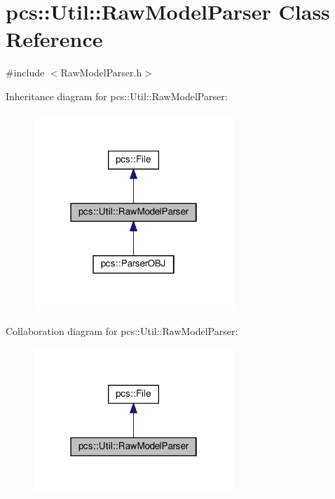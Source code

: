 \hypertarget{classpcs_1_1Util_1_1RawModelParser}{}\section{pcs\+:\+:Util\+:\+:Raw\+Model\+Parser Class Reference}
\label{classpcs_1_1Util_1_1RawModelParser}


{\ttfamily \#include $<$Raw\+Model\+Parser.\+h$>$}



Inheritance diagram for pcs\+:\+:Util\+:\+:Raw\+Model\+Parser\+:\nopagebreak
\begin{figure}[H]
\begin{center}
\leavevmode
\includegraphics[width=214pt]{classpcs_1_1Util_1_1RawModelParser__inherit__graph}
\end{center}
\end{figure}


Collaboration diagram for pcs\+:\+:Util\+:\+:Raw\+Model\+Parser\+:\nopagebreak
\begin{figure}[H]
\begin{center}
\leavevmode
\includegraphics[width=214pt]{classpcs_1_1Util_1_1RawModelParser__coll__graph}
\end{center}
\end{figure}
